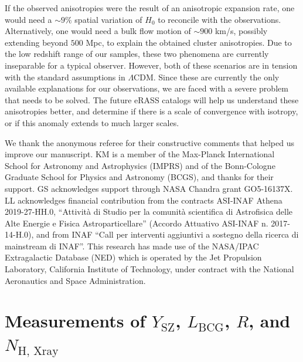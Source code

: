\documentclass{aa}   %
\newcommand{\Ysz}{$Y_{\text{SZ}}$}
\newcommand{\Lbcg}{$L_{\text{BCG}}$}
\begin{document}
If the observed anisotropies were the result of an anisotropic expansion rate, one would need a $\sim 9\%$ spatial variation of $H_0$ to reconcile with the observations. Alternatively, one would need a bulk flow motion of $\sim 900$ km/s, possibly extending beyond $500$ Mpc, to explain the obtained cluster anisotropies. Due to the low redshift range of our samples, these two phenomena are currently inseparable for a typical observer. However, both of these scenarios are in tension with the standard assumptions in $\Lambda$CDM. Since these are currently the only available explanations for our observations, we are faced with a severe problem that needs to be solved.  The future eRASS catalogs will help us understand these anisotropies better, and determine if there is a scale of convergence with isotropy, or if this anomaly extends to much larger scales. 

\begin{acknowledgements}  
We thank the anonymous referee for their constructive comments that helped us improve our manuscript. KM is a member of the Max-Planck International School for Astronomy and Astrophysics (IMPRS) and of the Bonn-Cologne Graduate School for Physics and Astronomy (BCGS), and thanks for their support. GS acknowledges support through NASA Chandra grant GO5-16137X. LL acknowledges financial contribution from the contracts ASI-INAF Athena 2019-27-HH.0, ``Attivit\`a di Studio per la comunit\`a scientifica di Astrofisica delle Alte Energie e Fisica Astroparticellare'' (Accordo Attuativo ASI-INAF n. 2017-14-H.0), and from INAF ``Call per interventi aggiuntivi a sostegno della ricerca di mainstream di INAF''.
This research has made use of the NASA/IPAC Extragalactic Database (NED)
which is operated by the Jet Propulsion Laboratory, California Institute of Technology, under contract with the National Aeronautics and Space Administration.
\end{acknowledgements}

\newpage


\newpage

\appendix

\section{Measurements of \Ysz, \Lbcg, $R$, and $N_{\text{H, Xray}}$}
\end{document}
